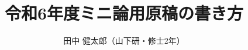 \documentclass{/workdir/classes/minithesis2024j}
\begin{document}
\title{令和6年度ミニ論用原稿の書き方}
\author{田中 健太郎（山下研・修士2年）}

\setlength{\baselineskip}{4.4mm}

\maketitle

\thispagestyle{empty}
\pagestyle{empty}









\end{document}
